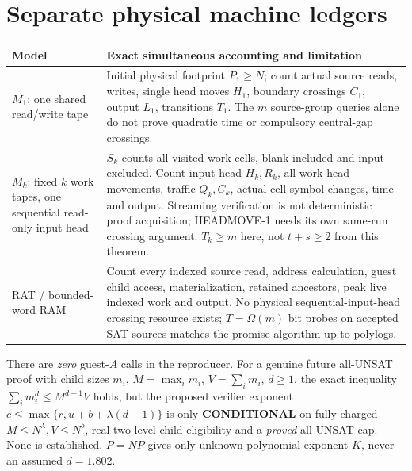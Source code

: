\documentclass[11pt]{article}
\begin{document}
\section{Separate physical machine ledgers}
\begin{center}\small
\begin{tabularx}{.97\linewidth}{p{.15\linewidth}X}
\toprule
Model & Exact simultaneous accounting and limitation\\\midrule
$M_1$: one shared read/write tape&
Initial physical footprint $P_1\ge N$; count
actual source reads, writes, single head moves
$H_1$, boundary crossings $C_1$, output $L_1$,
transitions $T_1$. The $m$ source-group queries
alone do not prove quadratic time or compulsory
central-gap crossings.\\
$M_k$: fixed $k$ work tapes,
one sequential read-only input head&
$S_k$ counts all visited work cells, blank included
and input excluded. Count input-head $H_k,R_k$,
all work-head movements, traffic $Q_k,C_k$,
actual cell symbol changes, time and output.
Streaming verification is not deterministic proof
acquisition; HEADMOVE-1 needs its own same-run
crossing argument. $T_k\ge m$ here, not
$t+s\ge2$ from this theorem.\\
RAT / bounded-word RAM&
Count every indexed source read, address calculation,
guest child access, materialization, retained ancestors,
peak live indexed work and output. No physical
sequential-input-head crossing resource exists;
$T=\Omega(m)$ bit probes on accepted SAT sources
matches the promise algorithm up to polylogs.\\\bottomrule
\end{tabularx}
\end{center}
There are \emph{zero} guest-$A$ calls in the reproducer.
For a genuine future all-UNSAT proof with child sizes
$m_i$, $M=\max_i m_i$, $V=\sum_i m_i$, $d\ge1$,
the exact inequality
$\sum_i m_i^d\le M^{d-1}V$ holds, but the
proposed verifier exponent
$c\le\max\{r,u+b+\lambda(d-1)\}$ is only
\textbf{CONDITIONAL} on fully charged
$M\le N^\lambda,V\le N^b$, real two-level child
eligibility and a \emph{proved} all-UNSAT cap.
None is established. $P=NP$ gives only unknown
polynomial exponent $K$, never an assumed $d=1.802$.
\end{document}
